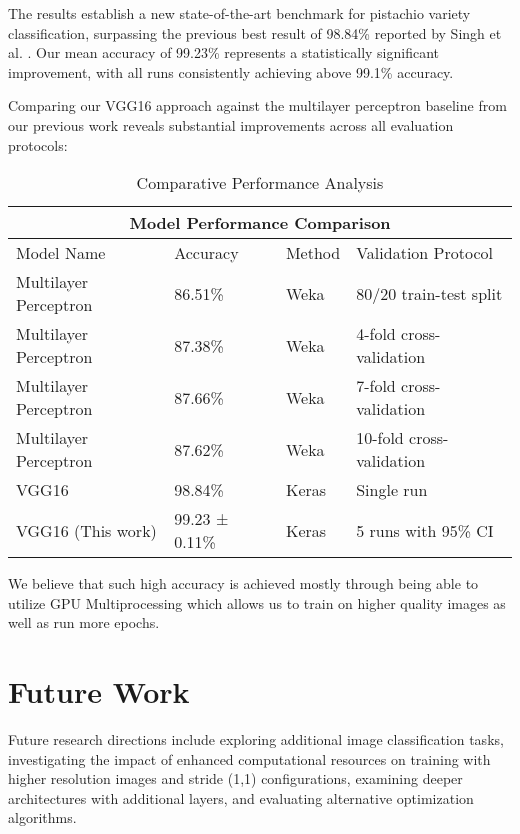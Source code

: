 \documentclass[conference]{IEEEtran}
\begin{document}
The results establish a new state-of-the-art benchmark for pistachio variety classification, surpassing the previous best result of 98.84\% reported by Singh et al. \cite{b7}. Our mean accuracy of 99.23\% represents a statistically significant improvement, with all runs consistently achieving above 99.1\% accuracy.

Comparing our VGG16 approach against the multilayer perceptron baseline from our previous work reveals substantial improvements across all evaluation protocols:

\begin{table}[htbp]
\centering
\caption{Comparative Performance Analysis}
\label{tab:comparison}
\begin{tabular}{|p{3.5cm}||p{1.5cm}|p{1.5cm}|p{3cm}|}
 \hline
 \multicolumn{4}{|c|}{Model Performance Comparison} \\
 \hline
Model Name& Accuracy & Method &Validation Protocol\\
 \hline
 Multilayer Perceptron & 86.51\% & Weka & 80/20 train-test split\\
 \hline
 Multilayer Perceptron & 87.38\% & Weka & 4-fold cross-validation\\
 \hline
 Multilayer Perceptron & 87.66\% & Weka & 7-fold cross-validation\\
 \hline
 Multilayer Perceptron & 87.62\% & Weka & 10-fold cross-validation\\
 \hline
 VGG16 \cite{b7} & 98.84\% & Keras & Single run\\
 \hline
 VGG16 (This work) & 99.23 ± 0.11\% & Keras & 5 runs with 95\% CI\\
 \hline
\end{tabular}
\end{table}

\hfill \break
We believe that such high accuracy is achieved mostly through being able to utilize GPU Multiprocessing which allows us to train on higher quality images as well as run more epochs.

\section{Future Work}
Future research directions include exploring additional image classification tasks, investigating the impact of enhanced computational resources on training with higher resolution images and stride (1,1) configurations, examining deeper architectures with additional layers, and evaluating alternative optimization algorithms.
\end{document}
